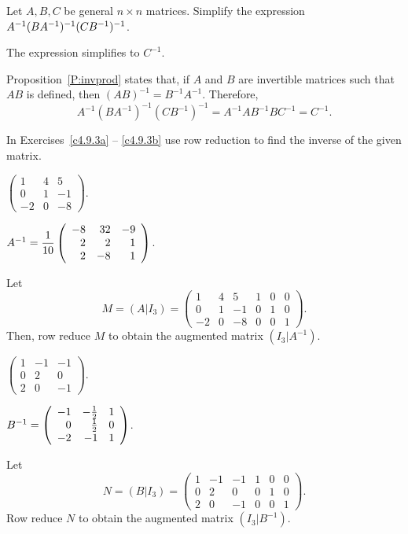 \documentclass{ximera}
\begin{document}
\begin{exercise} \label{c4.8.4}
Let $A,B,C$ be general $n\times n$ matrices.  Simplify the expression
$A^{-1}(BA^{-1})^{-1}(CB^{-1})^{-1}$.

\begin{solution}

\ans The expression simplifies to $C^{-1}$.

\soln Proposition~\ref{P:invprod} states that, if $A$ and $B$ are
invertible matrices such that $AB$ is defined, then $(AB)^{-1} =
B^{-1}A^{-1}$.  Therefore,
\[
A^{-1}(BA^{-1})^{-1}(CB^{-1})^{-1} = A^{-1}AB^{-1}BC^{-1} = C^{-1}.
\]

\end{solution}
\end{exercise}

\noindent In Exercises~\ref{c4.9.3a} -- \ref{c4.9.3b} use row reduction
to find the inverse of the given matrix.
\begin{exercise} \label{c4.9.3a}
$\left(\begin{array}{rrr} 1 & 4 & 5\\ 0 & 1 & -1\\ -2 & 0 & -8
\end{array}\right)$.

\begin{solution}
\ans
$A^{-1} = \displaystyle\frac{1}{10}\left(\begin{array}{rrr} -8 & 32 & -9 \\ 2 & 2 & 1 \\ 2 & -8 & 1\end{array}\right)$.

\soln Let
\[
M = (A|I_3) = \left(\begin{array}{rrr|rrr} 1 & 4 & 5 & 1 & 0 & 0 \\
0 & 1 & -1 & 0 & 1 & 0 \\
-2 & 0 & -8 & 0 & 0 & 1 \end{array}\right).
\]
Then, row reduce $M$ to obtain the augmented matrix $(I_3|A^{-1})$.

\end{solution}
\end{exercise}
\begin{exercise} \label{c4.9.3b}
$\left(\begin{array}{rrr} 1 & -1 & -1\\ 0 & 2 & 0\\ 2 & 0 & -1
\end{array}\right)$.

\begin{solution}
\ans
$B^{-1} = \left(\begin{array}{rrr} -1 & -\frac{1}{2} & 1 \\ 0 & \frac{1}{2} & 0 \\ -2 & -1 & 1\end{array}\right)$.

\soln Let
\[
N = (B|I_3) = \left(\begin{array}{rrr|rrr} 1 & -1 & -1 & 1 & 0 & 0 \\
0 & 2 & 0 & 0 & 1 & 0 \\ 2 & 0 & -1 & 0 & 0 & 1 \end{array}\right).
\]
Row reduce $N$ to obtain the augmented matrix $(I_3|B^{-1})$.

\end{solution}
\end{exercise}
\end{document}
